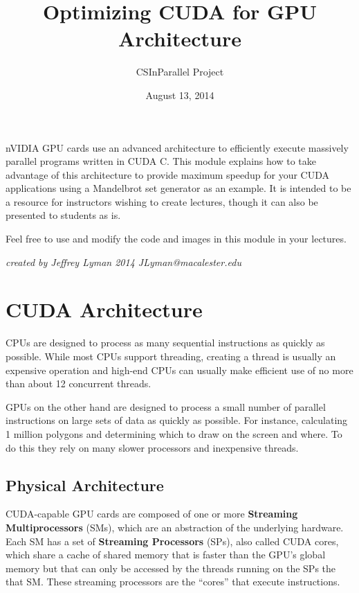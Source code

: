 \documentclass[letterpaper,10pt,openany,oneside]{sphinxmanual}
\title{Optimizing CUDA for GPU Architecture}
\date{August 13, 2014}
\author{CSInParallel Project}
\begin{document}
\maketitle
\tableofcontents
{}\label{index::doc}


nVIDIA GPU cards use an advanced architecture to efficiently execute
massively parallel programs written in CUDA C. This module explains how to take
advantage of this architecture to provide maximum speedup for
your CUDA applications using a Mandelbrot set generator as an
example. It is intended to be a resource for instructors wishing
to create lectures, though it can also be presented to students
as is.

Feel free to use and modify the code and images in this module
in your lectures.

\emph{created by Jeffrey Lyman 2014 JLyman@macalester.edu}


\chapter{CUDA Architecture}
\label{0-Architecture/Architecture:optimizing-cuda-for-gpu-architecture}\label{0-Architecture/Architecture::doc}\label{0-Architecture/Architecture:cuda-architecture}
CPUs are designed to process as many sequential instructions as
quickly as possible. While most CPUs support threading, creating
a thread is usually an expensive operation and high-end CPUs can
usually make efficient use of no more than about 12 concurrent threads.

GPUs on the other hand are designed to process a small number of
parallel instructions on large sets of data as quickly as
possible. For instance, calculating 1 million polygons and
determining which to draw on the screen and where. To do this they
rely on many slower processors and inexpensive threads.


\section{Physical Architecture}
\label{0-Architecture/Architecture:physical-architecture}
CUDA-capable GPU cards are composed of one or more \textbf{Streaming Multiprocessors}
(SMs), which are an abstraction of the underlying hardware.
Each SM has a set of \textbf{Streaming Processors} (SPs), also called CUDA cores, which share a cache of shared memory
that is faster than the GPU's global memory but that can only be accessed by the threads
running on the SPs the that SM.  These streaming processors are the ``cores'' that
execute instructions.
\end{document}
